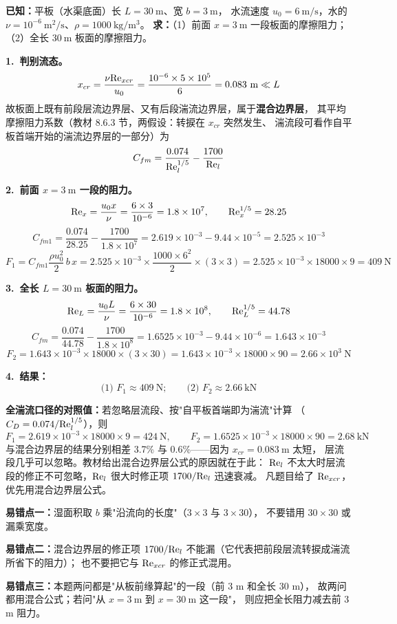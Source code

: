 \begin{jie}
\textbf{已知：}平板（水渠底面）长 $L=30\ \mathrm{m}$、宽 $b=3\ \mathrm{m}$，
水流速度 $u_0=6\ \mathrm{m/s}$，水的 $\nu=10^{-6}\ \mathrm{m^2/s}$、$\rho=1000\ \mathrm{kg/m^3}$。
\textbf{求：}（1）前面 $x=3\ \mathrm{m}$ 一段板面的摩擦阻力；（2）全长 $30\ \mathrm{m}$ 板面的摩擦阻力。

\textbf{1.\ 判别流态。}
\[
x_{cr}=\frac{\nu\Rey_{xcr}}{u_0}=\frac{10^{-6}\times5\times10^5}{6}=0.083\ \mathrm{m}\ll L
\]
故板面上既有前段层流边界层、又有后段湍流边界层，属于\textbf{混合边界层}，
其平均摩擦阻力系数（教材 8.6.3 节，两假设：转捩在 $x_{cr}$ 突然发生、
湍流段可看作自平板首端开始的湍流边界层的一部分）为
\[
C_{fm}=\frac{0.074}{\mathrm{Re}_l^{1/5}}-\frac{1700}{\mathrm{Re}_l}
\]

\textbf{2.\ 前面 $x=3\ \mathrm{m}$ 一段的阻力。}
\[
\mathrm{Re}_x=\frac{u_0x}{\nu}=\frac{6\times3}{10^{-6}}=1.8\times10^7,
\qquad \mathrm{Re}_x^{1/5}=28.25
\]
\[
C_{fm1}=\frac{0.074}{28.25}-\frac{1700}{1.8\times10^7}
=2.619\times10^{-3}-9.44\times10^{-5}=2.525\times10^{-3}
\]
\[
F_1=C_{fm1}\frac{\rho u_0^2}{2}\,b\,x
=2.525\times10^{-3}\times\frac{1000\times6^2}{2}\times(3\times3)
=2.525\times10^{-3}\times18000\times9=409\ \mathrm{N}
\]

\textbf{3.\ 全长 $L=30\ \mathrm{m}$ 板面的阻力。}
\[
\mathrm{Re}_L=\frac{u_0L}{\nu}=\frac{6\times30}{10^{-6}}=1.8\times10^8,
\qquad \mathrm{Re}_L^{1/5}=44.78
\]
\[
C_{fm}=\frac{0.074}{44.78}-\frac{1700}{1.8\times10^8}
=1.6525\times10^{-3}-9.44\times10^{-6}=1.643\times10^{-3}
\]
\[
F_2=1.643\times10^{-3}\times18000\times(3\times30)
=1.643\times10^{-3}\times18000\times90=2.66\times10^3\ \mathrm{N}
\]

\textbf{4.\ 结果：}
\[
\boxed{\,\text{(1) }F_1\approx409\ \mathrm{N};\qquad\text{(2) }F_2\approx2.66\ \mathrm{kN}\,}
\]
\end{jie}

\begin{tishi}
\textbf{全湍流口径的对照值：}若忽略层流段、按"自平板首端即为湍流"计算
（$C_D=0.074/\mathrm{Re}_l^{1/5}$），则
\[
F_1=2.619\times10^{-3}\times18000\times9=424\ \mathrm{N},\qquad
F_2=1.6525\times10^{-3}\times18000\times90=2.68\ \mathrm{kN}
\]
与混合边界层的结果分别相差 3.7\% 与 0.6\%——因为 $x_{cr}=0.083\ \mathrm{m}$ 太短，
层流段几乎可以忽略。教材给出混合边界层公式的原因就在于此：
$\mathrm{Re}_l$ 不太大时层流段的修正不可忽略，$\mathrm{Re}_l$ 很大时修正项 $1700/\mathrm{Re}_l$ 迅速衰减。
凡题目给了 $\mathrm{Re}_{xcr}$，优先用混合边界层公式。
\end{tishi}

\begin{yicuo}
\textbf{易错点一：}湿面积取 $b$ 乘"沿流向的长度"（$3\times3$ 与 $3\times30$），
不要错用 $30\times30$ 或漏乘宽度。

\textbf{易错点二：}混合边界层的修正项 $1700/\mathrm{Re}_l$ 不能漏（它代表把前段层流转捩成湍流所省下的阻力）；
也不要把它与 $\mathrm{Re}_{xcr}$ 的修正式混用。

\textbf{易错点三：}本题两问都是"从板前缘算起"的一段（前 3 m 和全长 30 m），
故两问都用混合公式；若问"从 $x=3\ \mathrm{m}$ 到 $x=30\ \mathrm{m}$ 这一段"，
则应把全长阻力减去前 3 m 阻力。
\end{yicuo}


